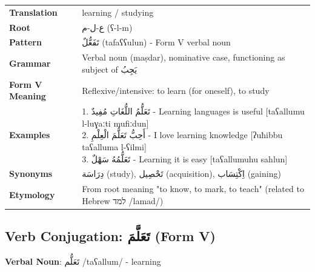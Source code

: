 \documentclass[letterpaper,12pt]{article}
\begin{document}
\begin{tabular}{p{3cm}p{10cm}}
\toprule
\textbf{Translation} & learning / studying \\
\textbf{Root} & \textarabic{ع-ل-م} (ʕ-l-m) \\
\textbf{Pattern} & \textarabic{تَفَعُّلٌ} (tafaʕʕulun) - Form V verbal noun \\
\textbf{Grammar} & Verbal noun (maṣdar), nominative case, functioning as subject of \textarabic{يَجِبُ} \\
\midrule
\textbf{Form V Meaning} & Reflexive/intensive: to learn (for oneself), to study \\
\midrule
\textbf{Examples} & \makecell[l]{\parbox{9.5cm}{
1. \textarabic{تَعَلُّمُ اللُّغَاتِ مُفِيدٌ} - Learning languages is useful [taʕallumu l-luɣaːti mufiːdun]\\
2. \textarabic{أَحِبُّ تَعَلُّمَ الْعِلْمِ} - I love learning knowledge [ʔuħibbu taʕalluma l-ʕilmi]\\
3. \textarabic{تَعَلُّمُهُ سَهْلٌ} - Learning it is easy [taʕallumuhu sahlun]
}} \\
\midrule
\textbf{Synonyms} & \textarabic{دِرَاسَة} (study), \textarabic{تَحْصِيل} (acquisition), \textarabic{اِكْتِسَاب} (gaining) \\
\textbf{Etymology} & From root meaning "to know, to mark, to teach" (related to Hebrew \texthebrew{למד} /lamad/) \\
\bottomrule
\end{tabular}

\subsection{Verb Conjugation: \textarabic{تَعَلَّمَ} (Form V)}
\par{\large \textbf{Verbal Noun}: \textarabic{تَعَلُّم} /taʕallum/ - learning}
\end{document}
